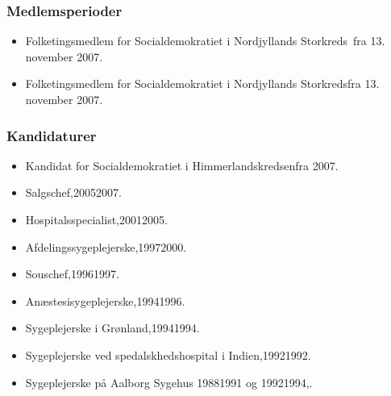 \documentclass[11pt, a4paper]{awesome-cv}
\begin{document}
\begin{cvletter}
\subsubsection*{Medlemsperioder}
\begin{itemize}
\item Folketingsmedlem for Socialdemokratiet i Nordjyllands Storkreds fra 13. november 2007.
\item Folketingsmedlem for Socialdemokratiet i Nordjyllands Storkredsfra 13. november 2007.
\end{itemize}
\subsubsection*{Kandidaturer}
\begin{itemize}
\item Kandidat for Socialdemokratiet i Himmerlandskredsenfra 2007.
\end{itemize}
\begin{itemize}
\item Salgschef,20052007.
\item Hospitalsspecialist,20012005.
\item Afdelingssygeplejerske,19972000.
\item Souschef,19961997.
\item Anæstesisygeplejerske,19941996.
\item Sygeplejerske i Grønland,19941994.
\item Sygeplejerske ved spedalskhedshospital i Indien,19921992.
\item Sygeplejerske på Aalborg Sygehus 19881991 og 19921994,.
\end{itemize}
\end{cvletter}
\end{document}
